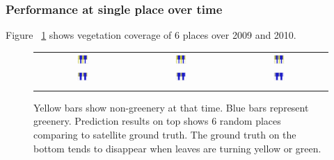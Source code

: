 \documentclass[10pt,journal,compsoc]{IEEEtran}
\begin{document}
\subsubsection{Performance at single place over time}
Figure ~\ref{fig:placeinbar} shows vegetation coverage of 6 places over 2009 and 2010.


\begin{figure}
\begin{center}
\begin{tabular}{ccc}
\includegraphics[width=0.14\textwidth]{bar/8560.jpg} &
\includegraphics[width=0.14\textwidth]{bar/8561.jpg} &
\includegraphics[width=0.14\textwidth]{bar/8881.jpg} \\
\includegraphics[width=0.14\textwidth]{bar/8911.jpg} &
\includegraphics[width=0.14\textwidth]{bar/9705.jpg} &
\includegraphics[width=0.14\textwidth]{bar/10816.jpg} \\
\\
\end{tabular}
\end{center}
\vspace{-24pt}
\caption{Yellow bars show non-greenery at that time. Blue bars represent greenery. Prediction results on top shows 6 random places comparing to satellite ground truth. The ground truth on the bottom tends to disappear when leaves are turning yellow or green.}
\label{fig:placeinbar}
\vspace{-12pt}
\end{figure}
\end{document}
